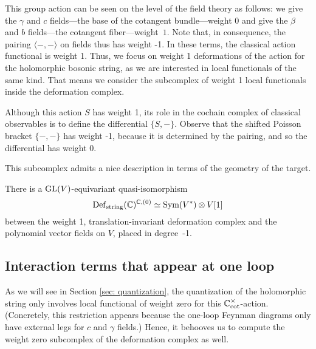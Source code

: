This group action can be seen on the level of the field theory as follows: 
we give the $\gamma$ and $c$ fields---the base of the cotangent bundle---weight $0$ and give the $\beta$ and $b$ fields---the cotangent fiber---weight~$1$. 
Note that, in consequence, the pairing $\langle-,-\rangle$ on fields thus has weight -1.
In these terms, the classical action functional is weight 1. 
Thus, we focus on weight 1 deformations of the action for the holomorphic bosonic string,
as we are interested in local functionals of the same kind.
That means we consider the subcomplex of weight 1 local functionals inside the deformation complex.

\begin{rmk}\label{rmk: classical weights}
Although this action $S$ has weight 1, 
its role in the cochain complex of classical observables is to define the differential $\{S,-\}$.
Observe that the shifted Poisson bracket $\{-,-\}$ has weight -1, 
because it is determined by the pairing, 
and so the differential has weight 0. 
\end{rmk}

This subcomplex admits a nice description in terms of the geometry of the target.

\begin{lem}
\label{lem: def complex wt zero} 
There is a ${\rm GL}(V)$-equivariant quasi-isomorphism
\[
{\rm Def}_{\rm string}(\mathbb C)^{\mathbb C, (0)} \simeq {\rm Sym}(V^*) \otimes V[1]
\]
between the weight 1, translation-invariant deformation complex 
and the polynomial vector fields on $V$, placed in degree~-1.
\end{lem}



\subsection{Interaction terms that appear at one loop}

As we will see in Section \ref{sec: quantization}, 
the quantization of the holomorphic string only involves local functional of weight zero for this $\mathbb C^\times_{\rm cot}$-action.
(Concretely, this restriction appears because the one-loop Feynman diagrams only have external legs for $c$ and $\gamma$ fields.)
Hence, it behooves us to compute the weight zero subcomplex of the deformation complex as well.

